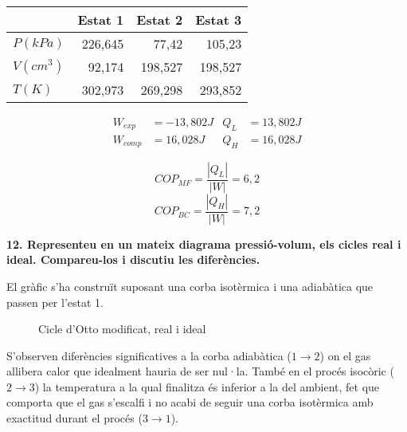 \documentclass[a4paper]{article}
\begin{document}
\begin{center}
	\begin{tabular}{l|rrr}
		& Estat 1 & Estat 2 & Estat 3 \\
		\hline
		$P(kPa)$ & 226,645 & 77,42 & 105,23 \\
		$V(cm^3)$ & 92,174 & 198,527 & 198,527 \\
		$T(K)$ & 302,973 & 269,298 & 293,852
	\end{tabular}
\end{center}

\begin{align*}
	W_{exp} &= -13,802 J &  Q_L &= 13,802 J \\
	W_{comp} &= 16,028 J &  Q_H &= 16,028 J
\end{align*}

$$ COP_{MF} = \frac{|Q_L|}{|W|} = 6,2 $$
$$ COP_{BC} = \frac{|Q_H|}{|W|} = 7,2 $$

\textbf{12. Representeu en un mateix diagrama pressió-volum, els cicles real i ideal. Compareu-los i discutiu les diferències.}

El gràfic s’ha construït suposant una corba isotèrmica i una adiabàtica que passen per l’estat 1.

\begin{figure}[H]
	\centering
	\caption{Cicle d'Otto modificat, real i ideal}
	\label{fig:otto_modificat}
\end{figure}

S’observen diferències significatives a la corba adiabàtica ($1 \rightarrow 2$) on el gas allibera calor que idealment hauria de ser nul·la. També en el procés isocòric ($2\rightarrow3$) la temperatura a la qual finalitza és inferior a la del ambient, fet que comporta que el gas s’escalfi i no acabi de seguir una corba isotèrmica amb exactitud durant el procés ($3\rightarrow1$).
\end{document}
